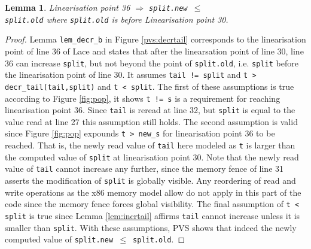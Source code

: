 \documentclass{sig-alternate-br}
\newtheorem{lemma}{Lemma}
\begin{document}
\begin{lemma}
	Linearisation point 36 $\Rightarrow$ \texttt{split.new $\leq$ \\split.old} where \texttt{split.old} is before Linearisation point 30. 
	\label{lem:lin36}
\end{lemma}
\begin{proof}
	Lemma \texttt{lem\_decr\_b} in Figure \ref{pvs:decrtail} corresponds to the linearisation point of line 36 of Lace and states that after the linearsation point of line 30, line 36 can increase \texttt{split}, but not beyond the point of \texttt{split.old}, i.e. \texttt{split} before the linearisation point of line 30.
	It assumes \texttt{tail != split} and \texttt{t > decr\_tail(tail,split)} and \texttt{t < split}.
	The first of these assumptions is true according to Figure \ref{fig:pop}, it shows \texttt{t != s} is a requirement for reaching linearisation point 36.
	Since \texttt{tail} is reread at line 32, but \texttt{split} is equal to the value read at line 27 this assumption still holds.
	The second assumption is valid since Figure \ref{fig:pop} expounds \texttt{t > new\_s} for linearisation point 36 to be reached.
	That is, the newly read value of \texttt{tail} here modeled as \texttt{t} is larger than the computed value of \texttt{split} at linearisation point 30.
	Note that the newly read value of \texttt{tail} cannot increase any further, since the memory fence of line 31 asserts the modification of \texttt{split} is globally visible.
	Any reordering of read and write operations as the x86 memory model allow do not apply in this part of the code since the memory fence forces global visibility.
	The final assumption of \texttt{t < split} is true since Lemma \ref{lem:incrtail} affirms \texttt{tail} cannot increase unless it is smaller than \texttt{split}.
	With these assumptions, PVS shows that indeed the newly computed value of \texttt{split.new $\leq$ split.old}.
\end{proof}
\end{document}
